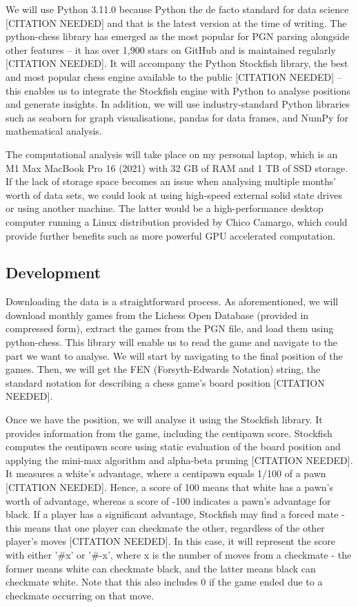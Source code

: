 \documentclass[%
 superscriptaddress,
showpacs,preprintnumbers,
 amsmath,
 amssymb,
 aps,
 pra,
showkeys,
onecolumn,
notitlepage,
11pt,
tightenlines      %
]{revtex4-1}
\begin{document}
We will use Python 3.11.0 because Python the de facto standard for data science [CITATION NEEDED] and that is the latest version at the time of writing. The python-chess library has emerged as the most popular for PGN parsing alongside other features – it has over 1,900 stars on GitHub and is maintained regularly [CITATION NEEDED]. It will accompany the Python Stockfish library, the best and most popular chess engine available to the public [CITATION NEEDED] – this enables us to integrate the Stockfish engine with Python to analyse positions and generate insights. In addition, we will use industry-standard Python libraries such as seaborn for graph visualisations, pandas for data frames, and NumPy for mathematical analysis.

The computational analysis will take place on my personal laptop, which is an M1 Max MacBook Pro 16 (2021) with 32 GB of RAM and 1 TB of SSD storage. If the lack of storage space becomes an issue when analysing multiple months' worth of data sets, we could look at using high-speed external solid state drives or using another machine. The latter would be a high-performance desktop computer running a Linux distribution provided by Chico Camargo, which could provide further benefits such as more powerful GPU accelerated computation.

\subsection{Development}
Downloading the data is a straightforward process. As aforementioned, we will download monthly games from the Lichess Open Database (provided in compressed form), extract the games from the PGN file, and load them using python-chess. This library will enable us to read the game and navigate to the part we want to analyse. We will start by navigating to the final position of the games. Then, we will get the FEN (Forsyth-Edwards Notation) string, the standard notation for describing a chess game's board position [CITATION NEEDED]. 

Once we have the position, we will analyse it using the Stockfish library. It provides information from the game, including the centipawn score. Stockfish computes the centipawn score using static evaluation of the board position and applying the mini-max algorithm and alpha-beta pruning [CITATION NEEDED]. It measures a white's advantage, where a centipawn equals 1/100 of a pawn [CITATION NEEDED]. Hence, a score of 100 means that white has a pawn's worth of advantage, whereas a score of -100 indicates a pawn's advantage for black. If a player has a significant advantage, Stockfish may find a forced mate - this means that one player can checkmate the other, regardless of the other player's moves [CITATION NEEDED]. In this case, it will represent the score with either '\#{x}' or '\#{-x}', where x is the number of moves from a checkmate - the former means white can checkmate black, and the latter means black can checkmate white. Note that this also includes 0 if the game ended due to a checkmate occurring on that move.
\end{document}
